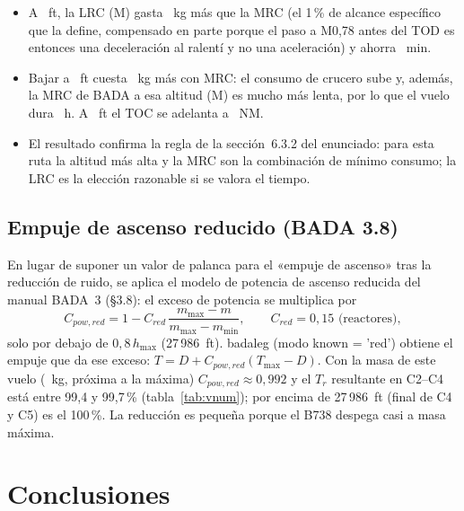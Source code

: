 \documentclass[11pt,a4paper]{article}
\DeclareRobustCommand{\m}[1]{{\ttfamily\def\_{\textunderscore\penalty100\relax}#1}}
\begin{document}


\begin{itemize}
\item A \cHI~ft, la LRC (M\cMachLRCI) gasta \cDiffLRCI~kg más que la MRC (el 1\,\% de alcance específico que la define, compensado en parte porque el paso a M0,78 antes del TOD es entonces una deceleración al ralentí y no una aceleración) y ahorra \cDiffTLRCI~min.
\item Bajar a \cHII~ft cuesta \cDiffH~kg más con MRC: el consumo de crucero sube y, además, la MRC de BADA a esa altitud (M\cMachMRCII) es mucho más lenta, por lo que el vuelo dura \cTMRCII~h. A \cHII~ft el TOC se adelanta a \cTOCII~NM.
\item El resultado confirma la regla de la sección~6.3.2 del enunciado: para esta ruta la altitud más alta y la MRC son la combinación de mínimo consumo; la LRC es la elección razonable si se valora el tiempo.
\end{itemize}

\subsection{Empuje de ascenso reducido (BADA 3.8)}\label{sec:red}

En lugar de suponer un valor de palanca para el «empuje de ascenso» tras la reducción de ruido, se aplica el modelo de potencia de ascenso reducida del manual BADA~3 (§3.8): el exceso de potencia se multiplica por
\begin{equation}
C_{pow,red} = 1 - C_{red}\,\frac{m_{\max}-m}{m_{\max}-m_{\min}},\qquad C_{red} = 0{,}15 \text{ (reactores)},
\end{equation}
solo por debajo de $0{,}8\,h_{\max}$ (27\,986~ft). \m{bada\_leg} (modo \m{known = 'red'}) obtiene el empuje que da ese exceso: $T = D + C_{pow,red}(T_{\max}-D)$. Con la masa de este vuelo (\sbTOW~kg, próxima a la máxima) $C_{pow,red}\approx0{,}992$ y el $T_r$ resultante en C2--C4 está entre 99,4 y 99,7\,\% (tabla~\ref{tab:vnum}); por encima de 27\,986~ft (final de C4 y C5) es el 100\,\%. La reducción es pequeña porque el B738 despega casi a masa máxima.

\section{Conclusiones}
\end{document}
